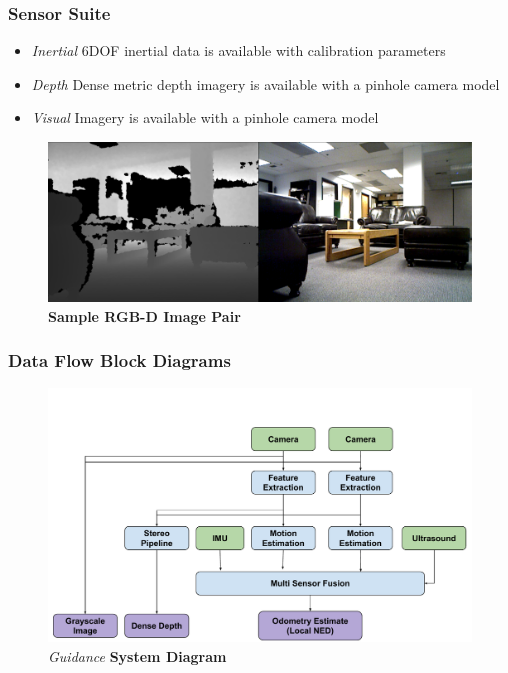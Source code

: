 \documentclass{beamer}
\begin{document}
\begin{frame}
\frametitle{Sensor Suite}
\begin{itemize}
\item{\textit{Inertial}} 6DOF inertial data is available with calibration parameters
\item{\textit{Depth}} Dense metric depth imagery is available with a pinhole camera model
\item{\textit{Visual}} Imagery is available with a pinhole camera model
\end{itemize}
\begin{figure}
\includegraphics[width=1.0\textwidth]{figures/xtion_rgb_depth}
\caption{\textbf{Sample RGB-D Image Pair}}
\end{figure}
\end{frame}


\begin{frame}
\frametitle{Data Flow Block Diagrams}
\begin{figure}
\vspace{-1cm}
\includegraphics[width=0.9\linewidth]{figures/GuidanceBlock}
\caption{\textit{Guidance} \textbf{ System Diagram}}
\end{figure}
\end{frame}
\end{document}
